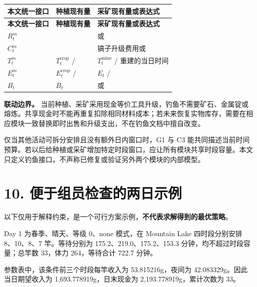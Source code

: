 \documentclass[11pt,a4paper]{article}
\begin{document}
{\small\begin{longtable}{L{0.22\dimexpr\textwidth-30pt\relax}L{0.24\dimexpr\textwidth-30pt\relax}L{0.54\dimexpr\textwidth-30pt\relax}}\toprule
\textbf{本文统一接口} & \textbf{种植现有量} & \textbf{采矿现有量或表达式}\\\midrule\endfirsthead
\textbf{本文统一接口} & \textbf{种植现有量} & \textbf{采矿现有量或表达式}\\\midrule\endhead
\bottomrule\endfoot
$R_t^m$ &  &  或 \\
$C_t^m$ &  & 镐子升级费用或 \\
$T_t^m$ & $T_t^{\mathrm{crop}}$ /  & $T_t^{\mathrm{mine}}$ / 重建的当日时间\\
$E_t^m$ & $E_t^{\mathrm{crop}}$ /  & $E_t$ / \\
$B_t$ & $B_t$ &  或 \\
\end{longtable}}

\textbf{联动边界。} 当前种植、采矿采用现金等价工具升级，钓鱼不需要矿石、金属锭或熔炼。共享现金时不能再重复扣除相同材料成本；若未来恢复实物库存，需要在相应模块一致替换即时出售和升级支出，不在钓鱼文档中擅自改变。\par

仅当其他活动可拆分安排且没有额外日内窗口时，G1 与 C3 能共同描述当前时间预算。若以后给种植或采矿增加特定时段窗口，应让所有模块共享时段容量。本文只定义钓鱼接口，不声称已修复或验证另外两个模块的内部模型。\par

\section*{\color{modelblue}10. 便于组员检查的两日示例}

以下仅用于解释约束，是一个可行方案示例，\textbf{不代表求解得到的最优策略}。\par

Day 1 为春季、晴天、等级 0、none 模式，在 Mountain Lake 四时段分别安排 8、10、8、7 竿。等待分别为 175.2、219.0、175.2、153.3 分钟，均不超过时段容量；总竿数 33，体力 264，等待合计 722.7 分钟。\par

参数表中，该条件前三个时段每竿收入为 53.815216g，夜间为 42.083329g。因此当日期望收入为 1,693.778919g，日末现金为 2,193.778919g，累计次数为 33。\par
\end{document}
